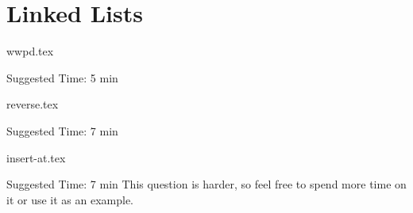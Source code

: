 \documentclass{exam}
\begin{document}
\section{Linked Lists}
\begin{questions}
    {wwpd.tex}
    \begin{questionmeta}
        Suggested Time: 5 min
    \end{questionmeta}

    {reverse.tex}
    \begin{questionmeta}
        Suggested Time: 7 min
    \end{questionmeta}


    {insert-at.tex}
    \begin{questionmeta}
        Suggested Time: 7 min
        This question is harder, so feel free to spend more time on it or use it as an example.
    \end{questionmeta}
\end{questions}
\end{document}
